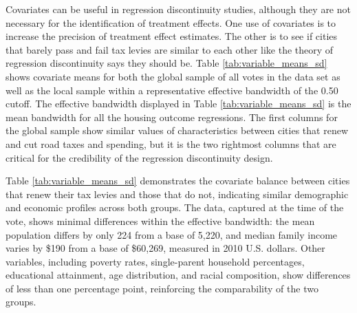 Covariates can be useful in regression discontinuity studies, although they are not necessary for the identification of treatment effects.  One use of covariates is to increase the precision of treatment effect estimates.  The other is to see if cities that barely pass and fail tax levies are similar to each other like the theory of regression discontinuity says they should be. Table \ref{tab:variable_means_sd} shows covariate means for both the global sample of all votes in the data set as well as the local sample within a representative effective bandwidth of the 0.50 cutoff. The effective bandwidth displayed in Table \ref{tab:variable_means_sd} is the mean bandwidth for all the housing outcome regressions. The first columns for the global sample show similar values of characteristics between cities that renew and cut road taxes and spending, but it is the two rightmost columns that are critical for the credibility of the regression discontinuity design.   

Table \ref{tab:variable_means_sd} demonstrates the covariate balance between cities that renew their tax levies and those that do not, indicating similar demographic and economic profiles across both groups. The data, captured at the time of the vote, shows minimal differences within the effective bandwidth: the mean population differs by only 224 from a base of 5,220, and median family income varies by \$190 from a base of \$60,269, measured in 2010 U.S. dollars. Other variables, including poverty rates, single-parent household percentages, educational attainment, age distribution, and racial composition, show differences of less than one percentage point, reinforcing the comparability of the two groups.


